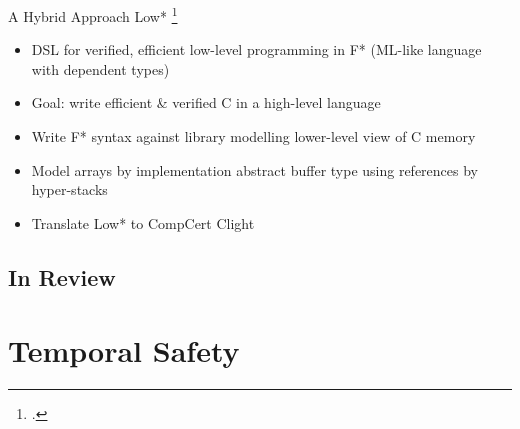 \documentclass[aspectratio=169]{beamer}
\begin{document}
\begin{frame}{A Hybrid Approach}
Low* \footcite{footcite:protzenko_verified_2017}
\begin{itemize}
    \item DSL for verified, efficient low-level programming in F* (ML-like language with dependent types)
    \item Goal: write efficient \& verified C in a high-level language
    \item Write F* syntax against library modelling lower-level view of C memory
    \item Model arrays by implementation abstract buffer type using references by hyper-stacks
    \item Translate Low* to CompCert Clight
\end{itemize}
\end{frame}

\subsection{In Review}



\section{Temporal Safety}
\end{document}
